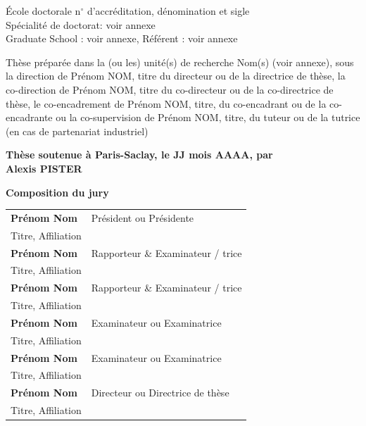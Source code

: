 \documentclass[12pt,a4paper]{book}
\begin{document}
\begin{titlepage}
        \vspace{6mm}

        \small École doctorale n$^{\circ}$ d'accréditation, dénomination et sigle\\
        \small Spécialité de doctorat: voir annexe\\
        \small Graduate School : voir annexe, Référent : voir annexe \\
        \vspace{6mm}

        \footnotesize Thèse préparée dans la (ou les) unité(s) de recherche Nom(s) (voir annexe), sous la direction de Prénom NOM, titre du directeur ou de la directrice de thèse, la co-direction de Prénom NOM, titre du co-directeur ou de la co-directrice de thèse, le co-encadrement de Prénom NOM, titre, du co-encadrant ou de la co-encadrante ou la co-supervision de Prénom NOM, titre, du tuteur ou de la tutrice (en cas de partenariat industriel) \\
        \vspace{15mm}

        \textbf{Thèse soutenue à Paris-Saclay, le JJ mois AAAA, par}\\
        \bigskip
        \Large {\color{Prune} \textbf{Alexis PISTER}} %

        \vspace{\fill} %

        \bigskip

        \flushleft
        \small \textbf{Composition du jury}\\
        \vspace{2mm}
        \scriptsize
        \begin{tabular}{|p{7cm}l}
            \arrayrulecolor{Prune}
            \textbf{Prénom Nom} &   Président ou Présidente\\
            Titre, Affiliation & \\
            \textbf{Prénom Nom} &  Rapporteur \& Examinateur / trice \\
            Titre, Affiliation   &   \\
            \textbf{Prénom Nom} &  Rapporteur \& Examinateur / trice \\
            Titre, Affiliation  &   \\
            \textbf{Prénom Nom} &  Examinateur ou Examinatrice \\
            Titre, Affiliation   &   \\
            \textbf{Prénom Nom} &  Examinateur ou Examinatrice \\
            Titre, Affiliation   &   \\
            \textbf{Prénom Nom} &  Directeur ou Directrice de thèse \\
            Titre, Affiliation   &   \\

        \end{tabular}

    \end{titlepage}
\end{document}
